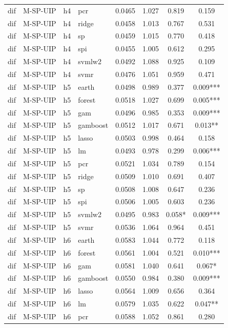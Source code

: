 \begin{ThreePartTable}
\begin{longtable}[t]{llclcccc}
dif & M-SP-UIP & h4 & pcr & 0.0465 & 1.027 & 0.819 & 0.159\\
dif & M-SP-UIP & h4 & ridge & 0.0458 & 1.013 & 0.767 & 0.531\\
dif & M-SP-UIP & h4 & sp & 0.0459 & 1.015 & 0.770 & 0.418\\
dif & M-SP-UIP & h4 & spi & 0.0455 & 1.005 & 0.612 & 0.295\\
dif & M-SP-UIP & h4 & svmlw2 & 0.0492 & 1.088 & 0.925 & 0.109\\
dif & M-SP-UIP & h4 & svmr & 0.0476 & 1.051 & 0.959 & 0.471\\
\addlinespace
dif & M-SP-UIP & h5 & earth & 0.0498 & 0.989 & 0.377 & 0.009***\\
dif & M-SP-UIP & h5 & forest & 0.0518 & 1.027 & 0.699 & 0.005***\\
dif & M-SP-UIP & h5 & gam & 0.0496 & 0.985 & 0.353 & 0.009***\\
dif & M-SP-UIP & h5 & gamboost & 0.0512 & 1.017 & 0.671 & 0.013**\\
dif & M-SP-UIP & h5 & lasso & 0.0503 & 0.998 & 0.464 & 0.158\\
dif & M-SP-UIP & h5 & lm & 0.0493 & 0.978 & 0.299 & 0.006***\\
dif & M-SP-UIP & h5 & pcr & 0.0521 & 1.034 & 0.789 & 0.154\\
dif & M-SP-UIP & h5 & ridge & 0.0509 & 1.010 & 0.691 & 0.407\\
dif & M-SP-UIP & h5 & sp & 0.0508 & 1.008 & 0.647 & 0.236\\
dif & M-SP-UIP & h5 & spi & 0.0506 & 1.005 & 0.603 & 0.236\\
dif & M-SP-UIP & h5 & svmlw2 & 0.0495 & 0.983 & 0.058* & 0.009***\\
dif & M-SP-UIP & h5 & svmr & 0.0536 & 1.064 & 0.964 & 0.451\\
\addlinespace
dif & M-SP-UIP & h6 & earth & 0.0583 & 1.044 & 0.772 & 0.118\\
dif & M-SP-UIP & h6 & forest & 0.0561 & 1.004 & 0.521 & 0.010***\\
dif & M-SP-UIP & h6 & gam & 0.0581 & 1.040 & 0.641 & 0.067*\\
dif & M-SP-UIP & h6 & gamboost & 0.0550 & 0.984 & 0.380 & 0.009***\\
dif & M-SP-UIP & h6 & lasso & 0.0564 & 1.009 & 0.656 & 0.364\\
dif & M-SP-UIP & h6 & lm & 0.0579 & 1.035 & 0.622 & 0.047**\\
dif & M-SP-UIP & h6 & pcr & 0.0588 & 1.052 & 0.861 & 0.280\\

\end{longtable}
\end{ThreePartTable}

